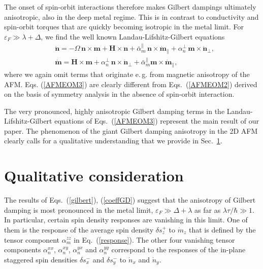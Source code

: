 \documentclass[%
  twocolumn,
  aps,
  prb,
  amsmath,
  amssymb,
  superscriptaddress,
  nofootinbib,
  floatfix
]{revtex4-1}
\newcommand{\n}{\nonumber}
\newcommand{\ep}{\varepsilon}
\newcommand{\bb}{\boldsymbol}
\newcommand{\0}{^{\phantom{\dagger}}}
\begin{document}

The onset of spin-orbit interactions therefore makes Gilbert dampings ultimately anisotropic, also in the deep metal regime. This is in contrast to conductivity and spin-orbit torques that are quickly becoming isotropic in the metal limit. 
For $\ep_F\gg \lambda+\Delta$, we find the well known Landau-Lifshitz-Gilbert equations
\begin{align}
&\dot{\bb{n}} = -\Omega\, \bb{n}\!\times\!\bb{m} +\bb{H}\!\times\!\bb{n}+\bar{\alpha}^\parallel_m\,\bb{n}\!\times\!\dot{\bb{m}}_\parallel+\alpha_n^\perp\,\bb{m}\!\times\! \dot{\bb{n}}_\perp,\n\\
&\dot{\bb{m}} =\bb{H}\times\bb{m}+\alpha_n^\perp\,\bb{n} \times \dot{\bb{n}}_\perp
+\bar{\alpha}_m^\parallel \bb{m} \times \dot{\bb{m}}_\parallel,
\label{AFMEOM3}
\end{align}
where we again omit terms that originate e.\,g. from magnetic anisotropy of the AFM. 
Eqs. (\ref{AFMEOM3}) are clearly different from Eqs.~(\ref{AFMEOM2}) derived on the basis of symmetry analysis in the absence of spin-orbit interaction. 

The very pronounced, highly anisotropic Gilbert damping terms in the Landau-Lifshitz-Gilbert equations of Eqs.~(\ref{AFMEOM3}) represent the main result of our paper. The phenomenon of the giant Gilbert damping anisotropy in the 2D AFM clearly calls for a qualitative understanding that we provide in Sec.~\ref{sec:qual}.

\section{Qualitative consideration}\label{sec:qual}

The results of Eqs.~(\ref{gilbert}), (\ref{coeffGD}) suggest that the anisotropy of Gilbert damping is most pronounced in the metal limit, $\ep_F\gg \Delta+\lambda$ as far as $\lambda \tau/\hbar \gg 1$. In particular, certain spin density responses are vanishing in this limit. One of them is the response of the average spin density $\delta s_z^+$ to $\dot{m}_z$ that is defined by the tensor component $\alpha^{zz}_m$ in Eq.~(\ref{response}). The other four vanishing tensor components $\alpha^{xx}_n$, $\alpha^{xy}_n$, $\alpha^{yx}_n$ and $\alpha^{yy}_n$ correspond to the responses of the in-plane staggered spin densities $\delta s_{x}^-$ and $\delta s_{y}^-$ to $\dot{n}_x$ and $\dot{n}_y$.  
\end{document}
